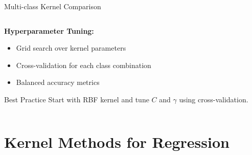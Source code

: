 \documentclass[8pt,aspectratio=1610]{beamer}
\begin{document}
\begin{frame}{Multi-class Kernel Comparison}
\begin{columns}[t]
\begin{column}{0.48\textwidth}
\vspace{0.3cm}
\textbf{Hyperparameter Tuning:}
\begin{itemize}
\setlength{\itemsep}{1pt}
\item Grid search over kernel parameters
\item Cross-validation for each class combination
\item Balanced accuracy metrics
\end{itemize}

\vspace{0.3cm}
\begin{alertblock}{Best Practice}
Start with RBF kernel and tune $C$ and $\gamma$ using cross-validation.
\end{alertblock}
\end{column}
\end{columns}
\end{frame}

\section{Kernel Methods for Regression}
\end{document}
